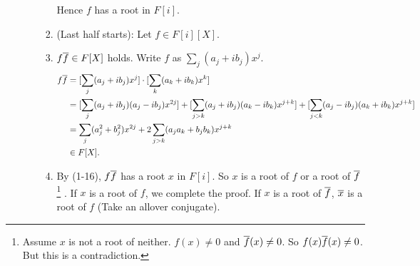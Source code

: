 \documentclass[9pt]{ltjsarticle}
\begin{document}
\begin{itemize}
\begin{itemize}
\begin{enumerate}
      Hence $f$ has a root in $F[i]$.
      \item
      (Last half starts):
      Let $f\in F[i][X]$.
      \item
      $f\overline{f} \in F[X]$ holds.
      \pf
      Write $f$ as $\sum_j (a_j + ib_j)x^j$.
      \begin{align}
        f \overline{f}
        &=
        [\sum_j (a_j + ib_j)x^j] \cdot [\sum_k (a_k + ib_k)x^k]\\
        &=
        [\sum_j (a_j+ib_j)(a_j-ib_j)x^{2j}]
        +
        [\sum_{j>k} (a_j+ib_j)(a_k-ib_k)x^{j+k}]
        +
        [\sum_{j<k} (a_j-ib_j)(a_k+ib_k)x^{j+k}]\\
        &=
        \sum_j (a_j^2+b_j^2)x^{2j} + 2\sum_{j>k} (a_j a_k + b_j b_k)x^{j+k}\\
        &\in
        F[X].
      \end{align}
      \item
      By (1-16), $f\overline{f}$ has a root $x$ in $F[i]$.
      So $x$ is a root of $f$ or a root of $\overline{f}$
      \footnote{Assume $x$ is not a root of neither.
      $f(x)\neq 0$ and $\overline{f}(x)\neq 0$.
      So $f(x)\overline{f}(x)\neq 0$.  But this is a contradiction.}
      .
      If $x$ is a root of $f$, we complete the proof.
      If $x$ is a root of $\overline{f}$, $\overline{x}$ is a root of $f$ (Take an allover conjugate).


\end{enumerate}
\end{itemize}
\end{itemize}
\end{document}
